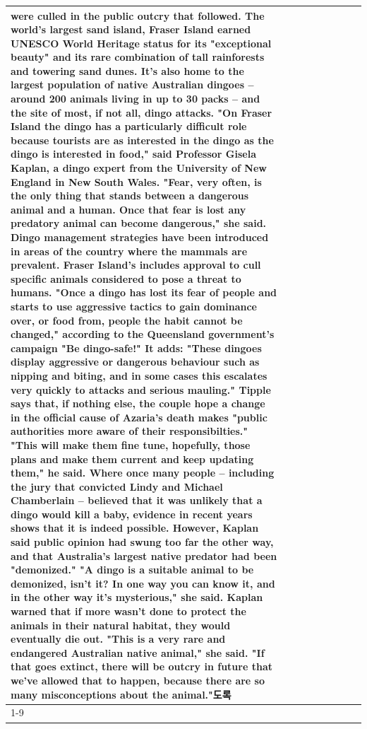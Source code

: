 \begin{table}[H]
\begin{tabular}{lllrlllll}
were culled in the public outcry that followed. The world's largest sand island, Fraser Island earned UNESCO World Heritage status for its "exceptional beauty" and its rare combination of tall rainforests and towering sand dunes. It's also home to the largest population of native Australian dingoes -- around 200 animals living in up to 30 packs -- and the site of most, if not all, dingo attacks. "On Fraser Island the dingo has a particularly difficult role because tourists are as interested in the dingo as the dingo is interested in food," said Professor Gisela Kaplan, a dingo expert from the University of New England in New South Wales. "Fear, very often, is the only thing that stands between a dangerous animal and a human. Once that fear is lost any predatory animal can become dangerous," she said. Dingo management strategies have been introduced in areas of the country where the mammals are prevalent. Fraser Island's includes approval to cull specific animals considered to pose a threat to humans. "Once a dingo has lost its fear of people and starts to use aggressive tactics to gain dominance over, or food from, people the habit cannot be changed," according to the Queensland government's campaign "Be dingo-safe!" It adds: "These dingoes display aggressive or dangerous behaviour such as nipping and biting, and in some cases this escalates very quickly to attacks and serious mauling." Tipple says that, if nothing else, the couple hope a change in the official cause of Azaria's death makes "public authorities more aware of their responsibilties." "This will make them fine tune, hopefully, those plans and make them current and keep updating them," he said. Where once many people -- including the jury that convicted Lindy and Michael Chamberlain -- believed that it was unlikely that a dingo would kill a baby, evidence in recent years shows that it is indeed possible. However, Kaplan said public opinion had swung too far the other way, and that Australia's largest native predator had been "demonized." "A dingo is a suitable animal to be demonized, isn't it? In one way you can know it, and in the other way it's mysterious," she said. Kaplan warned that if more wasn't done to protect the animals in their natural habitat, they would eventually die out. "This is a very rare and endangered Australian native animal," she said. "If that goes extinct, there will be outcry in future that we've allowed that to happen, because there are so many misconceptions about the animal."도록 \\
\cline{1-9}

\end{tabular}
\end{table}
